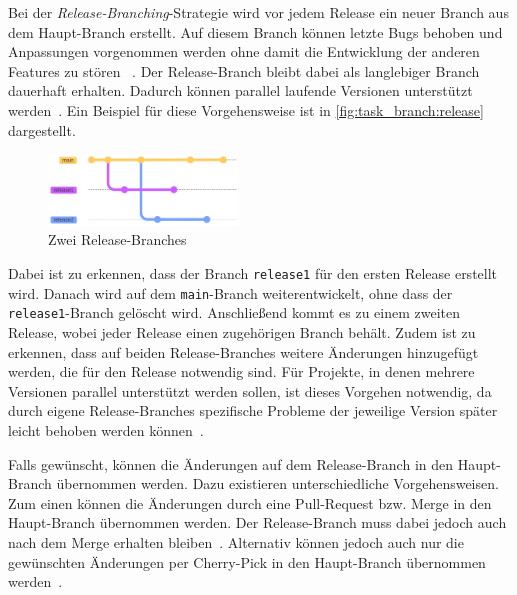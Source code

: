 Bei der \emph{Release\hyp Branching}\hyp Strategie wird vor jedem Release ein neuer Branch aus dem Haupt\hyp Branch erstellt. Auf diesem Branch können letzte Bugs behoben und Anpassungen vorgenommen werden ohne damit die Entwicklung der anderen Features zu stören ~\cite{tucker_basics_2023}. Der Release\hyp Branch bleibt dabei als langlebiger Branch dauerhaft erhalten. Dadurch können parallel laufende Versionen unterstützt werden~\cite{hart_besten_2020}. Ein Beispiel für diese Vorgehensweise ist in \autoref{fig:task_branch:release} dargestellt.

\begin{figure}
    \includegraphics[width=0.45\textwidth]{assets/diagrams/task_branch/release-branch.pdf}
    \caption{Zwei Release\hyp Branches}
    \label{fig:task_branch:release}
\end{figure}

Dabei ist zu erkennen, dass der Branch \texttt{release1} für den ersten Release erstellt wird. Danach wird auf dem \texttt{main}\hyp Branch weiterentwickelt, ohne dass der \texttt{release1}-Branch gelöscht wird. Anschließend kommt es zu einem zweiten Release, wobei jeder Release einen zugehörigen Branch behält. Zudem ist zu erkennen, dass auf beiden Release\hyp Branches weitere Änderungen hinzugefügt werden, die für den Release notwendig sind.
Für Projekte, in denen mehrere Versionen parallel unterstützt werden sollen, ist dieses Vorgehen notwendig, da durch eigene Release\hyp Branches spezifische Probleme der jeweilige Version später leicht behoben werden können~\cite{hart_besten_2020}.

Falls gewünscht, können die Änderungen auf dem Release\hyp Branch in den Haupt\hyp Branch übernommen werden. Dazu existieren unterschiedliche Vorgehensweisen. Zum einen können die Änderungen durch eine Pull\hyp Request bzw. Merge in den Haupt\hyp Branch übernommen werden. Der Release\hyp Branch muss dabei jedoch auch nach dem Merge erhalten bleiben~\cite{tucker_basics_2023}. Alternativ können jedoch auch nur die gewünschten Änderungen per Cherry\hyp Pick in den Haupt\hyp Branch übernommen werden~\cite{vijayma_git_2022}.

